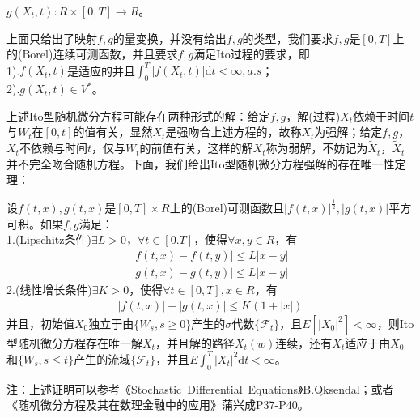             $g(X_t,t):R\times [0,T] \rightarrow R$。
            \par
            上面只给出了映射$f,g$的量变换，并没有给出$f,g$的类型，我们要求$f,g$是$[0,T]$上的(Borel)连续可测函数，并且要求$f,g$满足Ito过程的要求，即\\
            1).$f(X_t,t)$是适应的并且$\int_0^T |f(X_t,t)|\mathrm{d}t < \infty,a.s$；\\
            2).$g(X_t,t)\in V^*$。
            \par
            上述Ito型随机微分方程可能存在两种形式的解：给定$f,g$，解(过程)$X_t$依赖于时间$t$
            与$W_t$在$[0,t]$的值有关，显然$X_t$是强吻合上述方程的，故称$X_t$为强解；给定$f,g$，$X_t$不依赖与时间$t$，仅与$W_t$的前值有关，这样的解$X_t$称为弱解，不妨记为$\tilde{X}_t$，$\tilde{X}_t$并不完全吻合随机方程。下面，我们给出Ito型随机微分方程强解的存在唯一性定理：
            \begin{theorem}[强解的存在唯一性]
                设$f(t,x),g(t,x)$是$[0,T]\times R$上的(Borel)可测函数且$|f(t,x)|^{\frac 12},|g(t,x)|$平方可积。如果$f,g$满足：\\
                1.(Lipschitz条件)$\exists L >0$，$\forall t\in [0.T]$，使得$\forall x,y \in R$，有
                \begin{align*}
                    |f(t,x) - f(t,y) | \leqslant L|x-y|\\
                    |g(t,x) - g(t,y) | \leqslant L|x-y|
                \end{align*}
                2.(线性增长条件)$\exists K > 0$，使得$\forall t\in [0,T],x\in R$，有
                \begin{align*}
                    |f(t,x)|+ |g(t,x)|\leqslant K(1+|x|)
                \end{align*}
                并且，初始值$X_0$独立于由$\{W_s,s \geqslant 0\}$产生的$\sigma$代数$\{\mathcal{F}_t\}$，且$E[|X_0|^2]<\infty$，则Ito型随机微分方程存在唯一解$X_t$，并且解的路径$X_t(w)$连续，还有$X_t$适应于由$X_0$和$\{W_s,s \leqslant t\}$产生的流域$\{\mathcal{F}_t\}$，并且$E\int_0^T|X_t|^2\mathrm{d}t < \infty$。
            \end{theorem}
            注：上述证明可以参考《Stochastic\ Differential\ Equations》B.Qksendal；或者《随机微分方程及其在数理金融中的应用》蒲兴成P37-P40。
